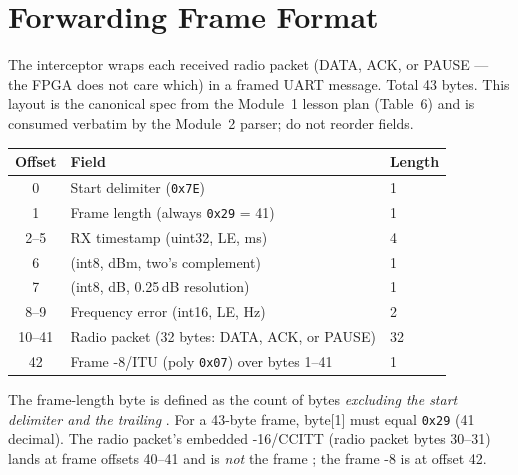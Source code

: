 \documentclass[11pt,letterpaper]{article}
\begin{document}

\newpage
\section{Forwarding Frame Format}
The interceptor wraps each received radio packet (DATA, ACK, or PAUSE --- the FPGA does not care which) in a framed UART message. Total 43 bytes. This layout is the canonical spec from the Module~1 lesson plan (Table~6) and is consumed verbatim by the Module~2 parser; do not reorder fields.
\begin{table}[h!]
	\centering
	\begin{tabular}{c l l}
		\toprule
		\textbf{Offset} & \textbf{Field} & \textbf{Length} \\
		\midrule
		0 & Start delimiter (\texttt{0x7E}) & 1 \\
		1 & Frame length (always \texttt{0x29} = 41) & 1 \\
		2--5 & \mbox{RX} timestamp (uint32, \mbox{LE}, ms) & 4 \\
		6 & \RSSI{} (int8, dBm, two's complement) & 1 \\
		7 & \SNR{} (int8, dB, 0.25\,dB resolution) & 1 \\
		8--9 & Frequency error (int16, \mbox{LE}, Hz) & 2 \\
		10--41 & Radio packet (32 bytes: DATA, ACK, or PAUSE) & 32 \\
		42 & Frame \CRC{}-8/ITU (poly \texttt{0x07}) over bytes 1--41 & 1 \\
		\bottomrule
	\end{tabular}
\end{table}

\begin{tcolorbox}[infobox={Length-Field Rule}]
The frame-length byte is defined as the count of bytes \emph{excluding the start delimiter and the trailing \CRC{}}. For a 43-byte frame, byte[1] must equal \texttt{0x29} (41 decimal). The radio packet's embedded \CRC{}-16/CCITT (radio packet bytes 30--31) lands at frame offsets 40--41 and is \emph{not} the frame \CRC{}; the frame \CRC{}-8 is at offset 42.
\end{tcolorbox}
\end{document}
